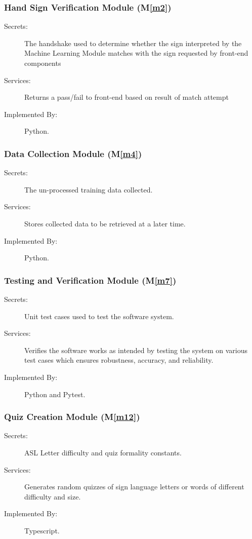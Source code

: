 \documentclass[12pt, titlepage]{article}
\newcommand{\mref}[1]{M\ref{#1}}
\begin{document}
\subsubsection{Hand Sign Verification Module (\mref{m2})}
\begin{description}
\item[Secrets:] The handshake used to determine whether the sign interpreted by the Machine Learning Module matches with the sign requested by front-end components
\item[Services:] Returns a pass/fail to front-end based on result of match attempt
\item[Implemented By:] Python.
\end{description}

\subsubsection{Data Collection Module (\mref{m4})}

\begin{description}
\item[Secrets:] The un-processed training data collected.
\item[Services:] Stores collected data to be retrieved at a later time.
\item[Implemented By:] Python.
\end{description}

\subsubsection{Testing and Verification Module (\mref{m7})}
\begin{description}
\item[Secrets:] Unit test cases used to test the software system.
\item[Services:] Verifies the software works as intended by testing the system on various test cases which ensures robustness, accuracy, and reliability.
\item[Implemented By:] Python and Pytest.
\end{description}

\subsubsection{Quiz Creation Module (\mref{m12})}
\begin{description}
\item[Secrets:] ASL Letter difficulty and quiz formality constants.
\item[Services:] Generates random quizzes of sign language letters or words of different difficulty and size.
\item[Implemented By:] Typescript.
\end{description}
\end{document}
